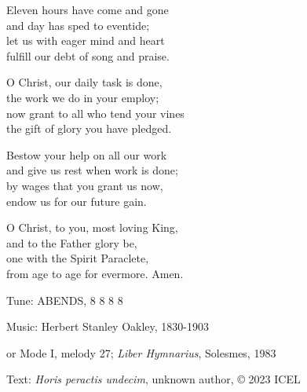\hymn

\begin{hymnverse}
Eleven hours have come and gone\\
and day has sped to eventide;\\
let us with eager mind and heart\\
fulfill our debt of song and praise.

O Christ, our daily task is done,\\
the work we do in your employ;\\
now grant to all who tend your vines\\
the gift of glory you have pledged.

Bestow your help on all our work\\
and give us rest when work is done;\\
by wages that you grant us now,\\
endow us for our future gain.

O Christ, to you, most loving King,\\
and to the Father glory be,\\
one with the Spirit Paraclete,\\
from age to age for evermore. Amen.
\end{hymnverse}

\begin{hymnsource}
Tune: ABENDS, 8 8 8 8

Music: Herbert Stanley Oakley, 1830-1903

or Mode I, melody 27; \emph{Liber Hymnarius}, Solesmes, 1983

Text: \emph{Horis peractis undecim}, unknown author, © 2023 ICEL
\end{hymnsource}